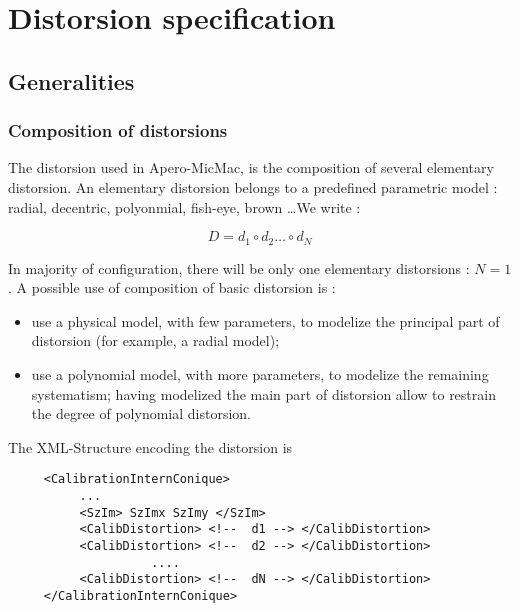 
\section{Distorsion specification} 


\subsection{Generalities}

\subsubsection{Composition of distorsions}
The distorsion used in  Apero-MicMac, is the composition of several elementary 
distorsion.  An elementary distorsion belongs to a predefined parametric model : radial,
decentric, polyonmial, fish-eye, brown \dots We write :

\begin{equation}
    D = d_1 \circ d_2  \dots  \circ d_N
\end{equation}

In majority of configuration, there will be only one elementary distorsions : $N=1$.
A possible use of composition of basic distorsion is :

\begin{itemize}
   \item use a physical model, with few parameters, to modelize the principal
         part of distorsion (for example, a radial model);

   \item use a polynomial model,  with more parameters, to modelize the remaining
         systematism; having modelized the main part of distorsion allow to restrain
         the degree of polynomial distorsion. 
\end{itemize}

The XML-Structure encoding the distorsion is

\begin{verbatim}
     <CalibrationInternConique>
          ... 
          <SzIm> SzImx SzImy </SzIm>
          <CalibDistortion> <!--  d1 --> </CalibDistortion>
          <CalibDistortion> <!--  d2 --> </CalibDistortion>
                    .... 
          <CalibDistortion> <!--  dN --> </CalibDistortion>
     </CalibrationInternConique>
\end{verbatim}

